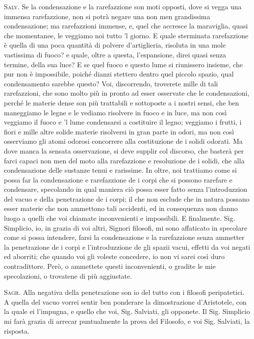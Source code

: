 \documentclass[11pt,twoside,openany]{book}
\newcommand{\speaker}[1]{\textcolor{rubric}{\textsc{#1}}\space}
\begin{document}
\speaker{Salv.} Se la condensazione e la rarefazzione son moti opposti, dove si vegga una immensa rarefazzione, non si potrà negare una non men grandissima condensazione; ma rarefazzioni immense, e, quel che accresce la maraviglia, quasi che momentanee, le veggiamo noi tutto 'l giorno. E quale sterminata rarefazzione è quella di una poca quantità di polvere d'artiglieria, risoluta in una mole vastissima di fuoco? e quale, oltre a questa, l'espansione, direi quasi senza termine, della sua luce? E se quel fuoco e questo lume si riunissero insieme, che pur non è impossibile, poiché dianzi stettero dentro quel piccolo spazio, qual condensamento sarebbe questo? Voi, discorrendo, troverete mille di tali rarefazzioni, che sono molto più in pronto ad esser osservate che le condensazioni, perché le materie dense son più trattabili e sottoposte a i nostri sensi, che ben maneggiamo le legne e le vediamo risolvere in fuoco e in luce, ma non così veggiamo il fuoco e 'l lume condensarsi a costituire il legno; veggiamo i frutti, i fiori e mille altre solide materie risolversi in gran parte in odori, ma non così osserviamo gli atomi odorosi concorrere alla costituzione de i solidi odorati. Ma dove manca la sensata osservazione, si deve supplir col discorso, che basterà per farci capaci non men del moto alla rarefazzione e resoluzione de i solidi, che alla condensazione delle sustanze tenui e rarissime. In oltre, noi trattiamo come si possa far la condensazione e rarefazzione de i corpi che si possono rarefare e condensare, specolando in qual maniera ciò possa esser fatto senza l'introduzzion del vacuo e della penetrazione de i corpi; il che non esclude che in natura possano esser materie che non ammettono tali accidenti, ed in consequenza non danno luogo a quelli che voi chiamate inconvenienti e impossibili. E finalmente. Sig. Simplicio, io, in grazia di voi altri, Signori filosofi, mi sono affaticato in specolare come si possa intendere, farsi la condensazione e la rarefazzione senza ammetter la penetrazione de i corpi e l'introduzzione de gli spazii vacui, effetti da voi negati ed aborriti; che quando voi gli voleste concedere, io non vi sarei così duro contradittore. Però, o ammettete questi inconvenienti, o gradite le mie specolazioni, o trovatene di più aggiustate.

\speaker{Sagr.} Alla negativa della penetrazione son io del tutto con i filosofi peripatetici. A quella del vacuo vorrei sentir ben ponderare la dimostrazione d'Aristotele, con la quale ei l'impugna, e quello che voi, Sig. Salviati, gli opponete. Il Sig. Simplicio mi farà grazia di arrecar puntualmente la prova del Filosofo, e voi Sig. Salviati, la risposta.
\end{document}
